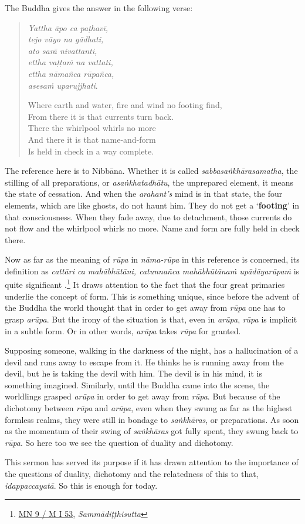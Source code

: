The Buddha gives the answer in the following verse:

\begin{quote}
\emph{Yattha āpo ca paṭhavī,}\\
\emph{tejo vāyo na gādhati,}\\
\emph{ato sarā nivattanti,}\\
\emph{ettha vaṭṭaṁ na vattati,}\\
\emph{ettha nāmañca rūpañca,}\\
\emph{asesaṁ uparujjhati}.

Where earth and water, fire and wind no footing find,\\
From there it is that currents turn back.\\
There the whirlpool whirls no more\\
And there it is that name-and-form\\
Is held in check in a way complete.
\end{quote}

The reference here is to Nibbāna. Whether it is called \emph{sabbasaṅkhārasamatha}, the stilling of all preparations, or \emph{asaṅkhatadhātu}, the unprepared element, it means the state of cessation. And when the \emph{arahant's} mind is in that state, the four elements, which are like ghosts, do not haunt him. They do not get a `\textbf{footing}' in that consciousness. When they fade away, due to detachment, those currents do not flow and the whirlpool whirls no more. Name and form are fully held in check there.

Now as far as the meaning of \emph{rūpa} in \emph{nāma-rūpa} in this reference is concerned, its definition as \emph{cattāri ca mahābhūtāni, catunnañca mahābhūtānaṁ upādāyarūpaṁ} is quite significant .\footnote{\href{https://suttacentral.net/mn9/pli/ms}{MN 9 / M I 53}, \emph{Sammādiṭṭhisutta}} It draws attention to the fact that the four great primaries underlie the concept of form. This is something unique, since before the advent of the Buddha the world thought that in order to get away from \emph{rūpa} one has to grasp \emph{arūpa}. But the irony of the situation is that, even in \emph{arūpa}, \emph{rūpa} is implicit in a subtle form. Or in other words, \emph{arūpa} takes \emph{rūpa} for granted.

Supposing someone, walking in the darkness of the night, has a hallucination of a devil and runs away to escape from it. He thinks he is running away from the devil, but he is taking the devil with him. The devil is in his mind, it is something imagined. Similarly, until the Buddha came into the scene, the worldlings grasped \emph{arūpa} in order to get away from \emph{rūpa}. But because of the dichotomy between \emph{rūpa} and \emph{arūpa}, even when they swung as far as the highest formless realms, they were still in bondage to \emph{saṅkhāras}, or preparations. As soon as the momentum of their swing of \emph{saṅkhāras} got fully spent, they swung back to \emph{rūpa}. So here too we see the question of duality and dichotomy.

This sermon has served its purpose if it has drawn attention to the importance of the questions of duality, dichotomy and the relatedness of this to that, \emph{idappaccayatā}. So this is enough for today.
